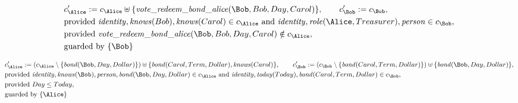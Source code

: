 \begin{align*}
&
c'_
{
\Alice
}
 := 
c_
{
\Alice
}
 \uplus 
\{
\mathit{\detokenize{
vote_redeem_bond_alice
}}
(
\Bob
,
Bob
,
Day
,
Carol
)
\}
, \qquad 
c'_
{
\Bob
}
 := 
c_
{
\Bob
}
,\\
&
\text{provided } 
\mathit{\detokenize{
identity
}}
,
\mathit{\detokenize{
knows
}}
(
Bob
)
,
\mathit{\detokenize{
knows
}}
(
Carol
)
 \in c_
{
\Alice
}
 \text{ and } 
\mathit{\detokenize{
identity
}}
,
\mathit{\detokenize{
role
}}
(
\Alice
,
Treasurer
)
,
\mathit{\detokenize{
person
}}
 \in c_
{
\Bob
}
,\\
&
\text{provided } 
\mathit{\detokenize{
vote_redeem_bond_alice
}}
(
\Bob
,
Bob
,
Day
,
Carol
)
 \notin c_
{
\Alice
}
,\\
&
\text{guarded by } \{
\Bob
\}
\end{align*}

\begin{align*}
&
c'_
{
\Alice
}
 := 
(c_
{
\Alice
}
 \setminus 
\{
\mathit{\detokenize{
bond
}}
(
\Bob
,
Day
,
Dollar
)
\}
) \uplus 
\{
\mathit{\detokenize{
bond
}}
(
Carol
,
Term
,
Dollar
)
,
\mathit{\detokenize{
knows
}}
(
Carol
)
\}
, \qquad 
c'_
{
\Bob
}
 := 
(c_
{
\Bob
}
 \setminus 
\{
\mathit{\detokenize{
bond
}}
(
Carol
,
Term
,
Dollar
)
\}
) \uplus 
\{
\mathit{\detokenize{
bond
}}
(
\Bob
,
Day
,
Dollar
)
\}
,\\
&
\text{provided } 
\mathit{\detokenize{
identity
}}
,
\mathit{\detokenize{
knows
}}
(
\Bob
)
,
\mathit{\detokenize{
person
}}
,
\mathit{\detokenize{
bond
}}
(
\Bob
,
Day
,
Dollar
)
 \in c_
{
\Alice
}
 \text{ and } 
\mathit{\detokenize{
identity
}}
,
\mathit{\detokenize{
today
}}
(
Today
)
,
\mathit{\detokenize{
bond
}}
(
Carol
,
Term
,
Dollar
)
 \in c_
{
\Bob
}
,\\
&
\text{provided } 
Day
\le
Today
,\\
&
\text{guarded by } \{
\Alice
\}
\end{align*}

